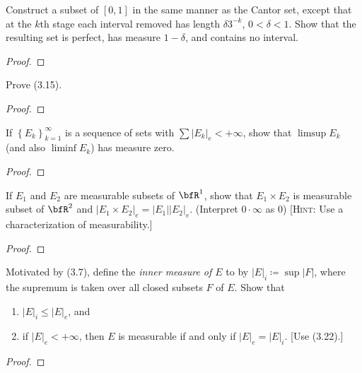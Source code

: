 \begin{problem}
Construct a subset of $[0,1]$ in the same manner as the Cantor set, except
that at the $k$th stage each interval removed has length $\delta 3^{-k}$,
$0<\delta<1$. Show that the resulting set is perfect, has measure
$1-\delta$, and contains no interval.
\end{problem}
\begin{proof}
\end{proof}
\newpage

\begin{problem}
Prove (3.15).
\end{problem}
\begin{proof}
\end{proof}
\newpage

\begin{problem}
If $\left\{E_k\right\}_{k=1}^\infty$ is a sequence of sets with
$\sum\left|E_k\right|_e<+\infty$, show that $\limsup E_k$ (and
also $\liminf E_k$) has measure zero.
\end{problem}
\begin{proof}
\end{proof}
\newpage

\begin{problem}
If $E_1$ and $E_2$ are measurable subsets of $\bfR^1$, show that $E_1\times
E_2$ is measurable subset of $\bfR^2$ and $\left|E_1\times
  E_2\right|_e=\left|E_1\right|\left|E_2\right|_e$. (Interpret
$0\cdot\infty$ as $0$) [\textsc{Hint:} Use a characterization of
measurability.]
\end{problem}
\begin{proof}
\end{proof}
\newpage

\begin{problem}
Motivated by (3.7), define the \emph{inner measure of $E$} to by
$\left|E\right|_i\coloneqq\sup\left|F\right|$, where the supremum is taken
over all closed subsets $F$ of $E$. Show that
\begin{enumerate}[label=(\roman*)]
\item $\left|E\right|_i\leq\left|E\right|_e$, and
\item if $\left|E\right|_e<+\infty$, then $E$ is measurable if and only if
  $\left|E\right|_e=\left|E\right|_i$. [Use (3.22).]
\end{enumerate}

\end{problem}
\begin{proof}
\end{proof}
\newpage

